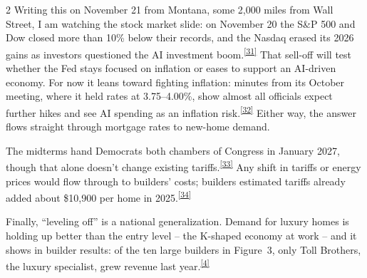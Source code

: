 \documentclass[10pt]{article}
\DeclareRobustCommand{\srcnum}[1]{\textsuperscript{\hyperlink{src#1}{[#1]}}}
\begin{document}
\begin{multicols}{2}
Writing this on November 21 from Montana, some 2,000 miles from Wall Street, I am watching the stock market slide: on November 20 the S\&P 500 and Dow closed more than 10\% below their records, and the Nasdaq erased its 2026 gains as investors questioned the AI investment boom.\srcnum{31} That sell-off will test whether the Fed stays focused on inflation or eases to support an AI-driven economy. For now it leans toward fighting inflation: minutes from its October meeting, where it held rates at 3.75--4.00\%, show almost all officials expect further hikes and see AI spending as an inflation risk.\srcnum{32} Either way, the answer flows straight through mortgage rates to new-home demand.

The midterms hand Democrats both chambers of Congress in January 2027, though that alone doesn't change existing tariffs.\srcnum{33} Any shift in tariffs or energy prices would flow through to builders' costs; builders estimated tariffs already added about \$10,900 per home in 2025.\srcnum{34}

Finally, ``leveling off'' is a national generalization. Demand for luxury homes is holding up better than the entry level -- the K-shaped economy at work -- and it shows in builder results: of the ten large builders in Figure~3, only Toll Brothers, the luxury specialist, grew revenue last year.\srcnum{4}

\end{multicols}

\end{document}
